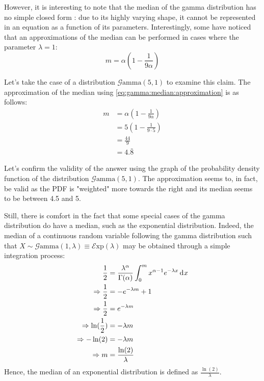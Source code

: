 \documentclass[12pt]{article}
\newcommand{\E}{\mathcal{E}}
\newcommand{\G}{\mathcal{G}}
\begin{document}
However, it is interesting to note that the median of the gamma distribution has no simple closed form : due to its
highly varying shape, it cannot be represented in an equation as a function of its parameters. Interestingly, some have
noticed that an approximations of the median can be performed in cases where the parameter
$\lambda=1$\cite{wikipediaGammaDistribution2022}:
\begin{equation}\label{eq:gamma:median:approximation}
	m = \alpha(1-\frac{1}{9\alpha})
\end{equation}

Let's take the case of a distribution $\G\text{amma}(5, 1)$ to examine this claim. The approximation of the median using
\autoref{eq:gamma:median:approximation} is as follows:
\begin{equation}
	\begin{split}
		m	&=	\alpha(1-\frac{1}{9\alpha})\\
			&=	5(1-\frac{1}{9\cdot 5})\\
			&=	\frac{44}{9}\\
			&=	4.\bar{8}
	\end{split}
\end{equation}

Let's confirm the validity of the answer using the graph of the probability density function of the distribution
$\G\text{amma}(5, 1)$.
The approximation seems to, in fact, be valid as the PDF is "weighted" more towards the right and its median seems to be
between 4.5 and 5.

Still, there is comfort in the fact that some special cases of the gamma distribution do have a
median, such as the exponential distribution. Indeed, the median of a continuous random variable following the gamma
distribution such that $X\sim\G\text{amma}(1, \lambda)\equiv\E\text{xp}(\lambda)$ may be obtained through a simple
integration process:
\begin{equation}
	\begin{split}
		\frac{1}{2}					&=	\frac{\lambda^\alpha}{\Gamma(\alpha)} \int^m_0 x^{\alpha-1} e^{-\lambda x}\mathop{}\!\mathrm{d^{}}x\\
		\Rightarrow\frac{1}{2}		&=	-e^{-\lambda m} + 1\\
		\Rightarrow\frac{1}{2}		&=	e^{-\lambda m}\\
		\Rightarrow\ln(\frac{1}{2})	&=	-\lambda m\\
		\Rightarrow-\ln(2)			&=	-\lambda m\\
		\Rightarrow m				&=	\frac{\ln(2)}{\lambda}
	\end{split}
\end{equation}
Hence, the median of an exponential distribution is defined as $\frac{\ln(2)}{\lambda}$.
\end{document}
